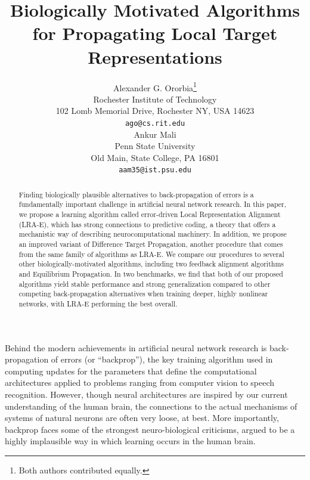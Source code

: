 \documentclass[letterpaper]{article} %
\begin{document}
%
\title{Biologically Motivated Algorithms for Propagating Local Target Representations}
\author{Alexander G. Ororbia\thanks{ \hspace{0.1cm} Both authors contributed equally.}\\
Rochester Institute of Technology\\
102 Lomb Memorial Drive, Rochester NY, USA 14623\\
{\tt ago@cs.rit.edu}\\
\And 
Ankur Mali\footnotemark[1] \\
Penn State University\\
Old Main, State College, PA 16801\\
{\tt aam35@ist.psu.edu}
}
\maketitle
\begin{abstract}
Finding biologically plausible alternatives to back-propagation of errors is a fundamentally important challenge in artificial neural network research. In this paper, we propose a learning algorithm called error-driven Local Representation Alignment (LRA-E), which has strong connections to predictive coding, a theory that offers a mechanistic way of describing neurocomputational machinery. In addition, we propose an improved variant of Difference Target Propagation, another procedure that comes from the same family of algorithms as LRA-E. We compare our procedures to several other biologically-motivated algorithms, including two feedback alignment algorithms and Equilibrium Propagation. In two benchmarks, we find that both of our proposed algorithms yield stable performance and strong generalization compared to other competing back-propagation alternatives when training deeper, highly nonlinear networks, with LRA-E performing the best overall.
\end{abstract}

\noindent Behind the modern achievements in artificial neural network research is back-propagation of errors \cite{rumelhart1988backprop} (or ``backprop''), the key training algorithm used in computing updates for the parameters that define the computational architectures applied to problems ranging from computer vision to speech recognition. However, though neural architectures are inspired by our current understanding of the human brain, the connections to the actual mechanisms of systems of natural neurons are often very loose, at best. More importantly, backprop faces some of the strongest neuro-biological criticisms, argued to be a highly implausible way in which learning occurs in the human brain.
\end{document}
